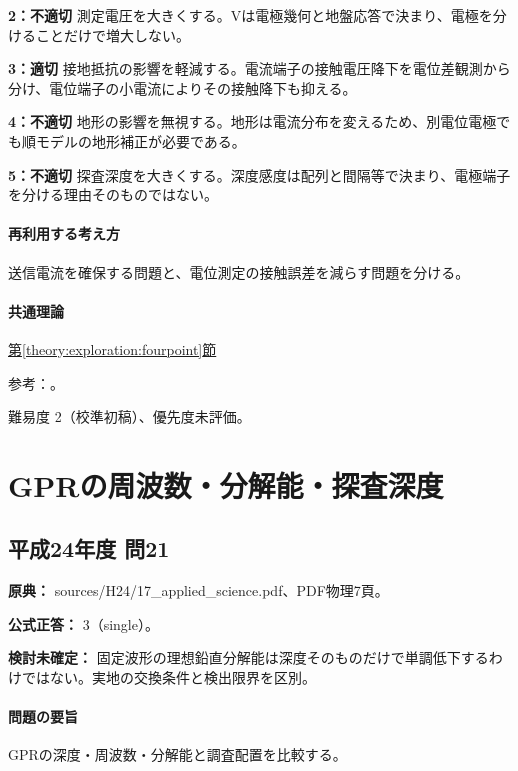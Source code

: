 \noindent\textbf{2：不適切} 測定電圧を大きくする。Vは電極幾何と地盤応答で決まり、電極を分けることだけで増大しない。\par

\noindent\textbf{3：適切} 接地抵抗の影響を軽減する。電流端子の接触電圧降下を電位差観測から分け、電位端子の小電流によりその接触降下も抑える。\par

\noindent\textbf{4：不適切} 地形の影響を無視する。地形は電流分布を変えるため、別電位電極でも順モデルの地形補正が必要である。\par

\noindent\textbf{5：不適切} 探査深度を大きくする。深度感度は配列と間隔等で決まり、電極端子を分ける理由そのものではない。\par

\paragraph{再利用する考え方} 送信電流を確保する問題と、電位測定の接触誤差を減らす問題を分ける。

\paragraph{共通理論} \hyperref[theory:exploration:fourpoint]{第\ref*{theory:exploration:fourpoint}節}

\par 参考：\cite{epa_resistivity}。

\par 難易度 2（校準初稿）、優先度未評価。

\section{GPRの周波数・分解能・探査深度}

\subsection{平成24年度 問21}
\label{q:h24-reg-applied-21}

\noindent\textbf{原典：} sources/H24/17\_applied\_science.pdf、PDF物理7頁。

\textbf{公式正答：} 3（single）。

\par\textbf{検討未確定：} 固定波形の理想鉛直分解能は深度そのものだけで単調低下するわけではない。実地の交換条件と検出限界を区別。

\paragraph{問題の要旨} GPRの深度・周波数・分解能と調査配置を比較する。

